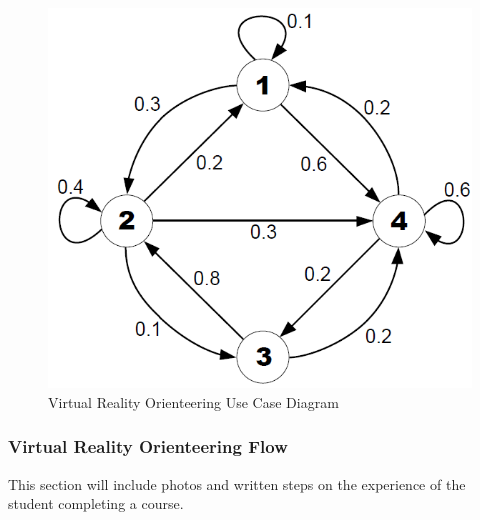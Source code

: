 \begin{figure}[htb]
	\centering
	\includegraphics[width=.5\textwidth]{Requirements/assets/vr-use-case-diagram.png}
	\caption[Virutal Reality Orienteering Use Case Diagram]{\label{Virutal Reality Orienteering Use Case Diagram}Virtual Reality Orienteering Use Case Diagram}
\end{figure}

\subsubsection{Virtual Reality Orienteering Flow}
This section will include photos and written steps on the experience of the student completing a course.

